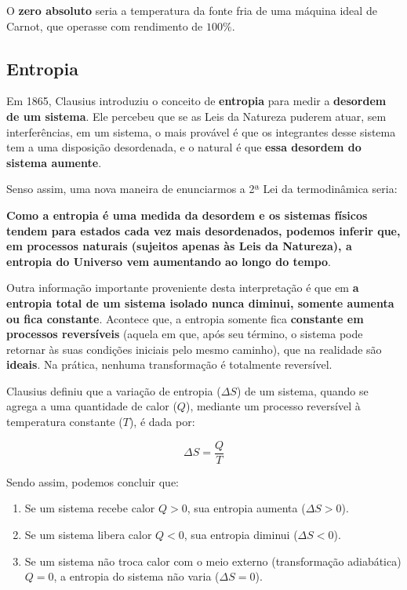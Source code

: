 \documentclass[12pt]{article}
\begin{document}
O \textbf{zero absoluto} seria a temperatura da fonte fria de uma máquina ideal de Carnot, que operasse com rendimento de \textbf{$100\%$}.


\hypertarget{x-entropia}{\subsection{Entropia}}
Em 1865, Clausius introduziu o conceito de \textbf{entropia} para medir a \textbf{desordem de um sistema}. Ele percebeu que se as Leis da Natureza puderem atuar, sem interferências, em um sistema, o mais provável é que os integrantes desse sistema tem a uma disposição desordenada, e o natural é que \textbf{essa desordem do sistema aumente}.


Senso assim, uma nova maneira de enunciarmos a 2ª Lei da termodinâmica seria:


\textbf{Como a entropia é uma medida da desordem e os sistemas físicos tendem para estados cada vez mais desordenados, podemos inferir que, em processos naturais (sujeitos apenas às Leis da Natureza), a entropia do Universo vem aumentando ao longo do tempo}.


Outra informação importante proveniente desta interpretação é que em \textbf{a entropia total de um sistema isolado nunca diminui, somente aumenta ou fica constante}. Acontece que, a entropia somente fica \textbf{constante em processos reversíveis} (aquela em que, após seu término, o sistema pode retornar às suas condições iniciais pelo mesmo caminho), que na realidade são \textbf{ideais}. Na prática, nenhuma transformação é totalmente reversível.


Clausius definiu que a variação de entropia ($\Delta S$) de um sistema, quando se agrega a uma quantidade de calor ($Q$), mediante um processo reversível à temperatura constante ($T$), é dada por:


\begin{equation}
    \Delta S = \dfrac{Q}{T}
\end{equation}


Sendo assim, podemos concluir que:


\begin{enumerate}

\item{Se um sistema recebe calor $Q>0$, sua entropia aumenta ($\Delta S>0$).}

\item{Se um sistema libera calor $Q<0$, sua entropia diminui ($\Delta S<0$).}

\item{Se um sistema não troca calor com o meio externo (transformação adiabática) $Q=0$, a entropia do sistema não varia ($\Delta S=0$).}

\end{enumerate}
\end{document}
